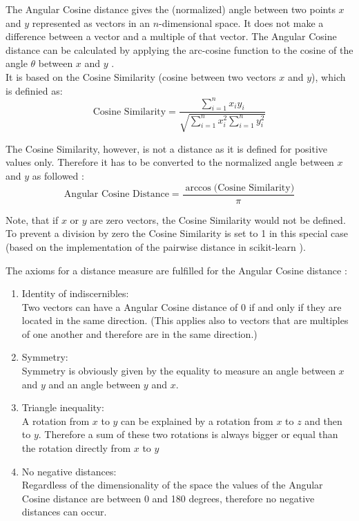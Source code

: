 
The Angular Cosine distance gives the (normalized) angle between two points $x$ and $y$ represented as vectors in an $n$-dimensional space. It does not make a difference between a vector and a multiple of that vector. The Angular Cosine distance can be calculated by applying the arc-cosine function to the cosine of the angle $\theta$ between $x$ and $y$ \cite{MMDS}. \\
It is based on the Cosine Similarity (cosine between two vectors $x$ and $y$), which is definied as: \\

\begin{equation}
	\text{Cosine Similarity} = \frac{\sum_{i=1}^{n} x_i y_i}{\sqrt{\sum_{i=1}^{n} x_i^2 \sum_{i=1}^{n} y_i^2}}
\end{equation}  

The Cosine Similarity, however, is not a distance as it is defined for positive values only. Therefore it has to be converted to the normalized angle between $x$ and $y$ as followed \cite{cosdist}: \\

\begin{equation}
	\text{Angular Cosine Distance} = \frac{\arccos({\text{Cosine Similarity})}}{\pi}
\end{equation}  

Note, that if $x$ or $y$ are zero vectors, the Cosine Similarity would not be defined. To prevent a division by zero the Cosine Similarity is set to 1 in this special case (based on the implementation of the pairwise distance in scikit-learn \cite{scikitlearn}). 

The axioms for a distance measure are fulfilled for the Angular Cosine distance \cite{MMDS}: \\

\begin{enumerate}
	\item Identity of indiscernibles:\\
	Two vectors can have a Angular Cosine distance of 0 if and only if they are located in the same direction. (This applies also to vectors that are multiples of one another and therefore are in the same direction.) 
	\item Symmetry: \\
	Symmetry is obviously given by the equality to measure an angle between $x$ and $y$ and an angle between $y$ and $x$. 
	\item Triangle inequality: \\
	A rotation from $x$ to $y$ can be explained by a rotation from $x$ to $z$ and then to $y$. Therefore a sum of these two rotations is always bigger or equal than the rotation directly from $x$ to $y$ 
	\item No negative distances:\\
	Regardless of the dimensionality of the space the values of the Angular Cosine distance are between 0 and 180 degrees, therefore no negative distances can occur. 
	
\end{enumerate}

